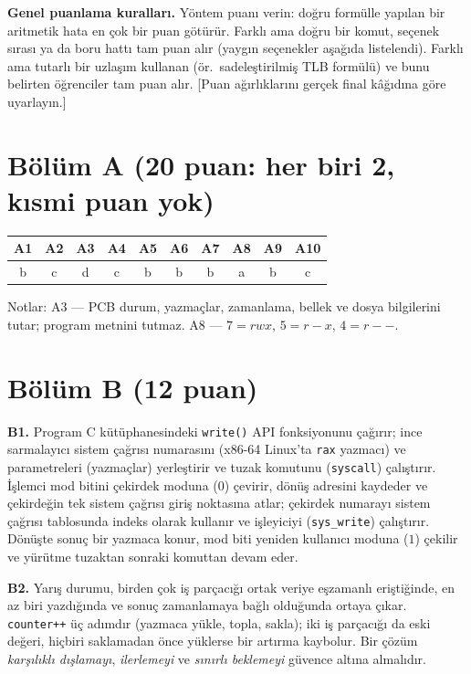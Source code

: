\documentclass[11pt,a4paper]{article}
\begin{document}
\textbf{Genel puanlama kuralları.} Yöntem puanı verin: doğru formülle yapılan bir aritmetik hata en çok bir puan götürür. Farklı ama doğru bir komut, seçenek sırası ya da boru hattı tam puan alır (yaygın seçenekler aşağıda listelendi). Farklı ama tutarlı bir uzlaşım kullanan (ör.\ sadeleştirilmiş TLB formülü) ve bunu belirten öğrenciler tam puan alır. [Puan ağırlıklarını gerçek final kâğıdına göre uyarlayın.]

\section*{Bölüm A (20 puan: her biri 2, kısmi puan yok)}
\begin{center}
\renewcommand{\arraystretch}{1.3}
\begin{tabular}{|*{10}{c|}}
\hline
A1 & A2 & A3 & A4 & A5 & A6 & A7 & A8 & A9 & A10 \\ \hline
b & c & d & c & b & b & b & a & b & c \\ \hline
\end{tabular}
\end{center}
Notlar: A3 --- PCB durum, yazmaçlar, zamanlama, bellek ve dosya bilgilerini tutar; program metnini tutmaz. A8 --- $7 = rwx$, $5 = r{-}x$, $4 = r{-}{-}$.

\section*{Bölüm B (12 puan)}
\textbf{B1.} Program C kütüphanesindeki \texttt{write()} API fonksiyonunu çağırır; ince sarmalayıcı sistem çağrısı numarasını (x86-64 Linux'ta \texttt{rax} yazmacı) ve parametreleri (yazmaçlar) yerleştirir ve tuzak komutunu (\texttt{syscall}) çalıştırır. İşlemci mod bitini çekirdek moduna ($0$) çevirir, dönüş adresini kaydeder ve çekirdeğin tek sistem çağrısı giriş noktasına atlar; çekirdek numarayı sistem çağrısı tablosunda indeks olarak kullanır ve işleyiciyi (\texttt{sys\_write}) çalıştırır. Dönüşte sonuç bir yazmaca konur, mod biti yeniden kullanıcı moduna ($1$) çekilir ve yürütme tuzaktan sonraki komuttan devam eder.

\textbf{B2.} Yarış durumu, birden çok iş parçacığı ortak veriye eşzamanlı eriştiğinde, en az biri yazdığında ve sonuç zamanlamaya bağlı olduğunda ortaya çıkar. \texttt{counter++} üç adımdır (yazmaca yükle, topla, sakla); iki iş parçacığı da eski değeri, hiçbiri saklamadan önce yüklerse bir artırma kaybolur. Bir çözüm \emph{karşılıklı dışlamayı}, \emph{ilerlemeyi} ve \emph{sınırlı beklemeyi} güvence altına almalıdır.
\end{document}
